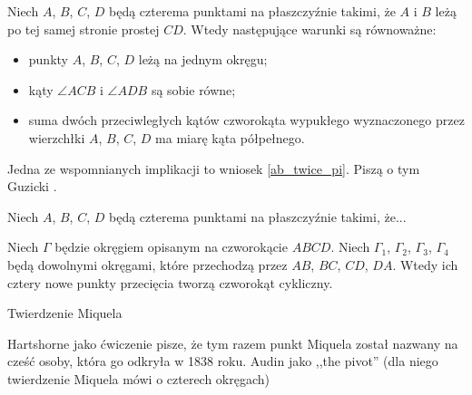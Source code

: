 \begin{proposition}
%
\label{prp_incircle}
	Niech $A$, $B$, $C$, $D$ będą czterema punktami na płaszczyźnie takimi, że $A$ i $B$ leżą po tej samej stronie prostej $CD$.
	Wtedy następujące warunki są równoważne:
	\begin{itemize}
		\item punkty $A$, $B$, $C$, $D$ leżą na jednym okręgu;
		\item kąty $\angle ACB$ i $\angle ADB$ są sobie równe;
		\item suma dwóch przeciwległych kątów czworokąta wypukłego wyznaczonego przez wierzchłki $A$, $B$, $C$, $D$ ma miarę kąta półpełnego.
	\end{itemize}
\end{proposition}

Jedna ze wspomnianych implikacji to wniosek \ref{ab_twice_pi}.
Piszą o tym Guzicki \cite[s. 11-13, 16, 17]{guzicki_2021}.

\begin{proposition}
	\label{prp_excircle}
	Niech $A$, $B$, $C$, $D$ będą czterema punktami na płaszczyźnie takimi, że...
\end{proposition}

\begin{proposition}
	Niech $\Gamma$ będzie okręgiem opisanym na czworokącie $ABCD$.
	Niech $\Gamma_1$, $\Gamma_2$, $\Gamma_3$, $\Gamma_4$ będą dowolnymi okręgami, które przechodzą przez $AB$, $BC$, $CD$, $DA$.
	Wtedy ich cztery nowe punkty przecięcia tworzą czworokąt cykliczny.
\end{proposition}

Twierdzenie Miquela
%
\loremipsum
{} %

Hartshorne jako ćwiczenie \cite[s. 61]{hartshorne2000} pisze, że tym razem punkt Miquela został nazwany na cześć osoby, która go odkryła w 1838 roku.
%
Audin \cite[s. 104]{audin_2003} jako ,,the pivot'' (dla niego twierdzenie Miquela mówi o czterech okręgach)
